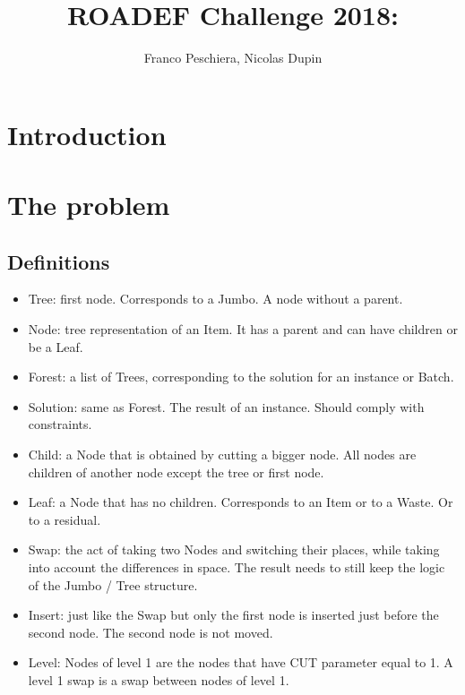 \documentclass{roadef}
\begin{document}
\title{ROADEF Challenge 2018: }


\author{Franco Peschiera, Nicolas Dupin}




\maketitle
\thispagestyle{empty}



\section{Introduction}

\section{The problem}

    \subsection{Definitions}

        \begin{itemize}

            \item Tree: first node. Corresponds to a Jumbo. A node without a parent.
            \item Node: tree representation of an Item. It has a parent and can have children or be a Leaf.
            \item Forest: a list of Trees, corresponding to the solution for an instance or Batch.
            \item Solution: same as Forest. The result of an instance. Should comply with constraints.
            \item Child: a Node that is obtained by cutting a bigger node. All nodes are children of another node except the tree or first node.
            \item Leaf: a Node that has no children. Corresponds to an Item or to a Waste. Or to a residual.
            \item Swap: the act of taking two Nodes and switching their places, while taking into account the differences in space. The result needs to still keep the logic of the Jumbo / Tree structure.
            \item Insert: just like the Swap but only the first node is inserted just before the second node. The second node is not moved.
            \item Level: Nodes of level 1 are the nodes that have CUT parameter equal to 1. A level 1 swap is a swap between nodes of level 1.

        \end{itemize}
\end{document}
